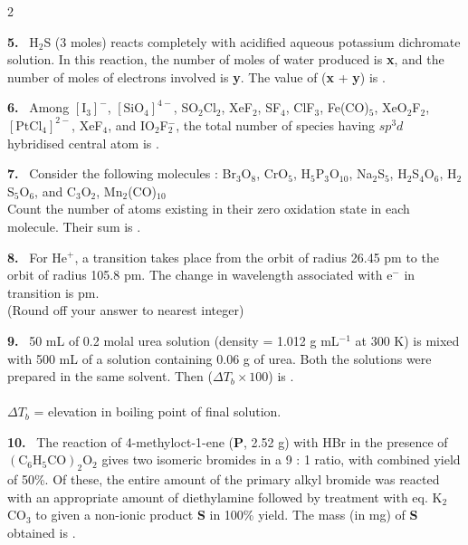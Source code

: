 \documentclass[10pt]{extarticle}
\newcommand{\qn}[1]{\par\smallskip\noindent\textbf{#1.}~}
\begin{document}
\begin{multicols}{2}
\qn{5} H$_2$S (3 moles) reacts completely with acidified aqueous potassium dichromate solution. In this reaction, the number of moles of water produced is \textbf{x}, and the number of moles of electrons involved is \textbf{y}. The value of (\textbf{x} + \textbf{y}) is \underline{\hspace{1cm}}.

\qn{6} Among $[\text{I}_3]^-$, $[\text{SiO}_4]^{4-}$, SO$_2$Cl$_2$, XeF$_2$, SF$_4$, ClF$_3$, Fe(CO)$_5$, XeO$_2$F$_2$, $[\text{PtCl}_4]^{2-}$, XeF$_4$, and IO$_2$F$_2^-$, the total number of species having $sp^3d$ hybridised central atom is \underline{\hspace{1cm}}.

\qn{7} Consider the following molecules : Br$_3$O$_8$, CrO$_5$, H$_5$P$_3$O$_{10}$, Na$_2$S$_5$, H$_2$S$_4$O$_6$, H$_2$S$_5$O$_6$, and C$_3$O$_2$, Mn$_2$(CO)$_{10}$\\
Count the number of atoms existing in their zero oxidation state in each molecule. Their sum is \underline{\hspace{1cm}}.

\qn{8} For He$^+$, a transition takes place from the orbit of radius 26.45 pm to the orbit of radius 105.8 pm. The change in wavelength associated with e$^-$ in transition is \underline{\hspace{1cm}} pm.\\
(Round off your answer to nearest integer)\\
\relax[\textbf{Use} : $\pi=3$, Bohr radius, a = 52.9 pm]

\qn{9} 50 mL of 0.2 molal urea solution (density = 1.012 g mL$^{-1}$ at 300 K) is mixed with 500 mL of a solution containing 0.06 g of urea. Both the solutions were prepared in the same solvent. Then ($\Delta T_b\times100$) is \underline{\hspace{1cm}}.\\
\relax[Use : Molar mass of urea = 60 g mol$^{-1}$; gas constant, R = 62 L Torr K$^{-1}$ mol$^{-1}$ ; Assume, $\Delta_{mix}H=0$, $\Delta_{mix}V=0$, $K_b=0.5$ K kg mol$^{-1}$]\\
$\Delta T_b$ = elevation in boiling point of final solution.

\qn{10} The reaction of 4-methyloct-1-ene (\textbf{P}, 2.52 g) with HBr in the presence of $(\text{C}_6\text{H}_5\text{CO})_2\text{O}_2$ gives two isomeric bromides in a 9 : 1 ratio, with combined yield of 50\%. Of these, the entire amount of the primary alkyl bromide was reacted with an appropriate amount of diethylamine followed by treatment with eq. K$_2$CO$_3$ to given a non-ionic product \textbf{S} in 100\% yield. The mass (in mg) of \textbf{S} obtained is \underline{\hspace{1cm}}.\\
\relax[Use molar mass (in g mol$^{-1}$) : H = 1, C = 12, N = 14, Br = 80]


\end{multicols}
\end{document}
